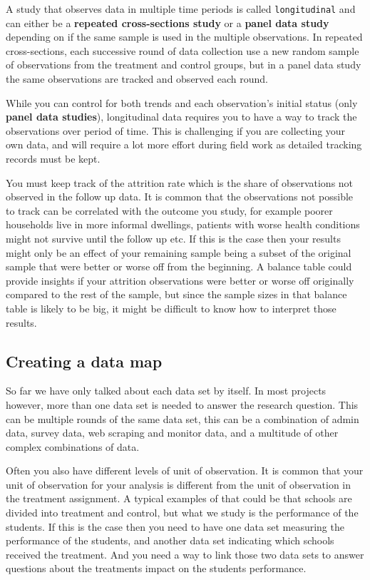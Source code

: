 A study that observes data in multiple time periods is called \texttt{longitudinal} and
can either be a \textbf{repeated cross-sections study} or a \textbf{panel data study} 
depending on if the same sample is used in the multiple observations.
In repeated cross-sections, each successive round of data collection use a new random sample
of observations from the treatment and control groups, 
but in a panel data study the same observations are tracked and observed each round.

While you can control for both trends 
and each observation's initial status (only \textbf{panel data studies}), 
longitudinal data requires you to have a way to track the observations over period of time.
This is challenging if you are collecting your own data, 
and will require a lot more effort during field work as detailed tracking records must be kept.

You must keep track of the attrition rate which is the share of observations not observed in the follow up data.
It is common that the observations not possible to track can be correlated with the outcome you study,
for example poorer households live in more informal dwellings,
patients with worse health conditions might not survive until the follow up etc. 
If this is the case then your results might only be an effect of your remaining sample
being a subset of the original sample that were better or worse off from the beginning.
A balance table could provide insights if your attrition observations were better or worse off 
originally compared to the rest of the sample, 
but since the sample sizes in that balance table is likely to be big, 
it might be difficult to know how to interpret those results.


\subsection{Creating a data map}

So far we have only talked about each data set by itself. 
In most projects however, more than one data set is needed to answer the research question. 
This can be multiple rounds of the same data set, 
this can be a combination of admin data, survey data, web scraping and monitor data, 
and a multitude of other complex combinations of data. 

Often you also have different levels of unit of observation. 
It is common that your unit of observation for your analysis is different from the unit of observation in the treatment assignment.
A typical examples of that could be that schools are divided into treatment and control, 
but what we study is the performance of the students. 
If this is the case then you need to have one data set measuring the performance of the students, 
and another data set indicating which schools received the treatment. 
And you need a way to link those two data sets to answer questions about the treatments impact on the students performance.

